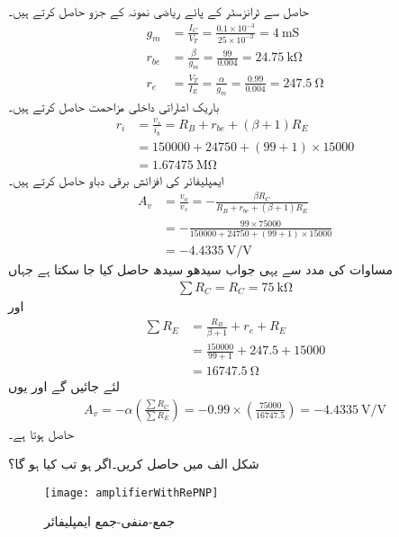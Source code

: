 حاصل   سے ٹرانزسٹر کے پائے ریاضی نمونہ  کے جزو حاصل کرتے ہیں۔
\begin{align*}
g_m&=\frac{I_C}{V_T}=\frac{0.1 \times 10^{-3}}{25 \times 10^{-3}}=\SI{4}{\milli \siemens}\\
r_{be}&=\frac{\beta}{g_m}=\frac{99}{0.004}=\SI{24.75}{\kilo \ohm}\\
r_e&=\frac{V_T}{I_E}=\frac{\alpha}{g_m}=\frac{0.99}{0.004}=\SI{247.5}{\ohm}
\end{align*}
باریک اشاراتی داخلی مزاحمت حاصل کرتے ہیں۔
\begin{align*}
r_i&=\frac{v_s}{i_b}=R_B+r_{be}+\left(\beta+1 \right )R_E\\
&=150000+24750+(99+1) \times 15000\\
&=\SI{1.67475}{\mega \ohm}
\end{align*}
ایمپلیفائر کی افزائش برقی دباو حاصل کرتے ہیں۔
\begin{align*}
A_v&=\frac{v_o}{v_s}=-\frac{\beta R_C}{R_B + r_{be}+(\beta+1)R_E}\\
&=-\frac{99 \times 75000}{150000+24750+(99+1) \times 15000}\\
&=\SI[per=frac,fraction=nice]{-4.4335}{\volt \per \volt}
\end{align*}
مساوات   کی مدد سے یہی جواب سیدھو سیدھ حاصل کیا جا سکتا ہے  جہاں
\begin{align*}
\sum{ R_C}=R_C=\SI{75}{\kilo \ohm}
\end{align*}
اور
\begin{align*}
\sum{R_E}&=\frac{R_B}{\beta+1}+r_e+R_E\\
&=\frac{150000}{99+1}+247.5+15000\\
&=\SI{16747.5}{\ohm}
\end{align*}
لئے جائیں گے اور یوں
\begin{align*}
A_v=-\alpha\left(\frac{\sum {R_C}}{\sum {R_E}} \right )=-0.99 \times \left(\frac{75000}{16747.5} \right )=\SI[per=frac,fraction=nice]{-4.4335}{\volt \per \volt}
\end{align*}
حاصل ہوتا ہے۔

شکل  الف میں  حاصل کریں۔اگر  ہو تب  کیا ہو گا؟
\begin{figure}
\centering
\texttt{[image: amplifierWithRePNP]}
\caption{جمع-منفی-جمع ایمپلیفائر}
\label{شکل_ٹرانزسٹر_جمع_منفی_جمع_امپلیفائر}
\end{figure}

